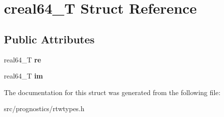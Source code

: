 \hypertarget{structcreal64__T}{}\section{creal64\+\_\+T Struct Reference}
\label{structcreal64__T}
\subsection*{Public Attributes}
\begin{DoxyCompactItemize}
\item 
\mbox{\label{structcreal64__T_aa5e87d519766cf4067e3e49e3460b2ca}} 
real64\+\_\+T {\bfseries re}
\item 
\mbox{\label{structcreal64__T_a28468f3795b886330a41edb3995b5269}} 
real64\+\_\+T {\bfseries im}
\end{DoxyCompactItemize}


The documentation for this struct was generated from the following file\+:\begin{DoxyCompactItemize}
\item 
src/prognostics/rtwtypes.\+h\end{DoxyCompactItemize}
